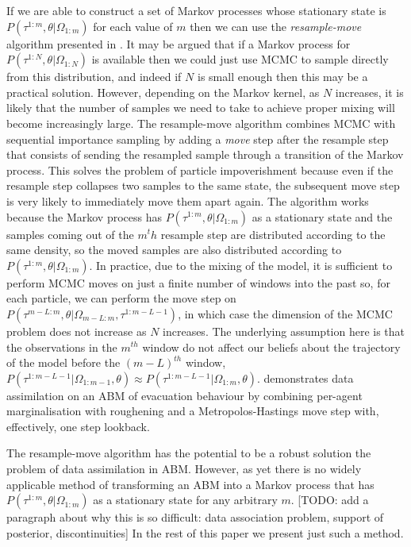 \documentclass{article}
\begin{document}
If we are able to construct a set of Markov processes whose stationary state is $P(\tau^{1:m},\theta|\Omega_{1:m})$ for each value of $m$ then we can use the \textit{resample-move} algorithm presented in \citet{gilks2001following}. It may be argued that if a Markov process for $P(\tau^{1:N},\theta|\Omega_{1:N})$ is available then we could just use MCMC to sample directly from this distribution, and indeed if $N$ is small enough then this may be a practical solution. However, depending on the Markov kernel, as $N$ increases, it is likely that the number of samples we need to take to achieve proper mixing will become increasingly large. The resample-move algorithm combines MCMC with sequential importance sampling by adding a \textit{move} step after the resample step that consists of sending the resampled sample through a transition of the Markov process. This solves the problem of particle impoverishment because even if the resample step collapses two samples to the same state, the subsequent move step is very likely to immediately move them apart again. The algorithm works because the Markov process has $P(\tau^{1:m},\theta|\Omega_{1:m})$ as a stationary state and the samples coming out of the $m^th$ resample step are distributed according to the same density, so the moved samples are also distributed according to $P(\tau^{1:m},\theta|\Omega_{1:m})$. In practice, due to the mixing of the model, it is sufficient to perform MCMC moves on just a finite number of windows into the past so, for each particle, we can perform the move step on $P(\tau^{m-L:m},\theta|\Omega_{m-L:m}, \tau^{1:m-L-1})$, in which case the dimension of the MCMC problem does not increase as $N$ increases. The underlying assumption here is that the observations in the $m^{th}$ window do not affect our beliefs about the trajectory of the model before the $(m-L)^{th}$ window, $P(\tau^{1:m-L-1}|\Omega_{1:m-1},\theta) \approx P(\tau^{1:m-L-1}|\Omega_{1:m},\theta)$. \citet{lueck_who_2019} demonstrates data assimilation on an ABM of evacuation behaviour by combining per-agent marginalisation with roughening and a Metropolos-Hastings move step with, effectively, one step lookback.

The resample-move algorithm has the potential to be a robust solution the problem of data assimilation in ABM. However, as yet there is no widely applicable method of transforming an ABM into a Markov process that has $P(\tau^{1:m},\theta|\Omega_{1:m})$ as a stationary state for any arbitrary $m$. [TODO: add a paragraph about why this is so difficult: data association problem, support of posterior, discontinuities] In the rest of this paper we present just such a method.
\end{document}
